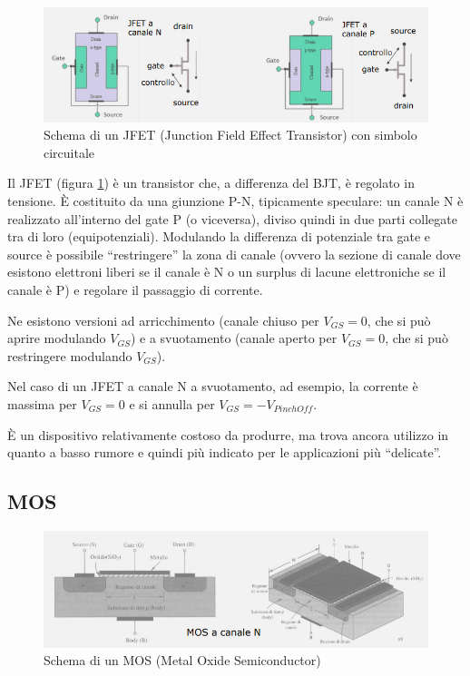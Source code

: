 \documentclass{article}
\begin{document}
\begin{figure}[h]
  \centering
  \includegraphics[scale=0.6]{IM_JFET}
  \caption{Schema di un JFET (Junction Field Effect Transistor) con simbolo circuitale}
  \label{Schema_JFET}
\end{figure}

Il JFET (figura \ref{Schema_JFET}) è un transistor che, a differenza del BJT, è regolato in tensione. È costituito da una giunzione P-N, tipicamente speculare: un canale N è realizzato all'interno del gate P (o viceversa), diviso quindi in due parti collegate tra di loro (equipotenziali). Modulando la differenza di potenziale tra gate e source è possibile ``restringere'' la zona di canale (ovvero la sezione di canale dove esistono elettroni liberi se il canale è N o un surplus di lacune elettroniche se il canale è P) e regolare il passaggio di corrente. 

\vspace{3mm}

Ne esistono versioni ad arricchimento (canale chiuso per $V_{GS} = 0$, che si può aprire modulando $V_{GS}$) e a svuotamento (canale aperto per $V_{GS} = 0$, che si può restringere modulando $V_{GS}$).

\vspace{3mm}

Nel caso di un JFET a canale N a svuotamento, ad esempio, la corrente è massima per $V_{GS} = 0$ e si annulla per  $V_{GS} = - V_{PinchOff}$.

\vspace{3mm}

È un dispositivo relativamente costoso da produrre, ma trova ancora utilizzo in quanto a basso rumore e quindi più indicato per le applicazioni più ``delicate''.

\subsection{MOS}

\begin{figure}[h]
  \centering
  \includegraphics[scale=0.7]{IM_MOS}
  \caption{Schema di un MOS (Metal Oxide Semiconductor)}
  \label{Schema_MOS}
\end{figure}
\end{document}
